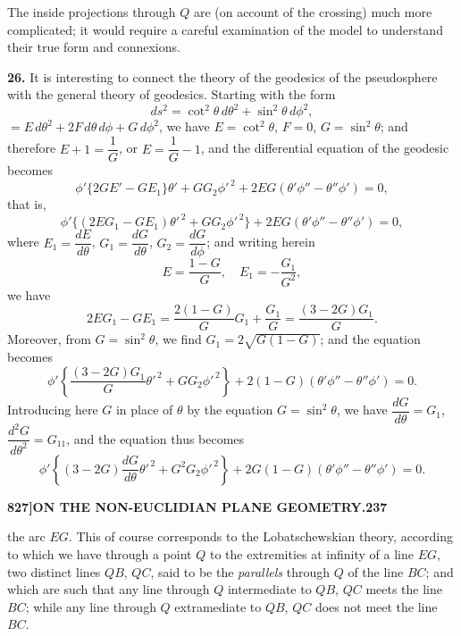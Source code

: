 \documentclass[12pt,a4paper]{article}
\theoremstyle{definition}
\begin{document}
The inside projections through $Q$ are (on account of the crossing) much more complicated; it would require a careful examination of the model to understand their true form and connexions.

\noindent\textbf{26.} It is interesting to connect the theory of the geodesics of the pseudosphere with the general theory of geodesics. Starting with the form
\[
ds^2 = \cot^2\theta\, d\theta^2 + \sin^2\theta\, d\phi^2,
\]
$= E\,d\theta^2 + 2F\,d\theta\,d\phi + G\,d\phi^2$, we have $E = \cot^2\theta$, $F = 0$, $G = \sin^2\theta$; and therefore $E + 1 = \dfrac{1}{G}$, or $E = \dfrac{1}{G} - 1$, and the differential equation of the geodesic becomes
\[
\phi'\{2GE' - GE_1\}\theta' + GG_2\phi'^{\,2} + 2EG(\theta'\phi'' - \theta''\phi') = 0,
\]
that is,
\[
\phi'\{(2EG_1 - GE_1)\theta'^{\,2} + GG_2\phi'^{\,2}\} + 2EG(\theta'\phi'' - \theta''\phi') = 0,
\]
where $E_1 = \dfrac{dE}{d\theta}$, $G_1 = \dfrac{dG}{d\theta}$, $G_2 = \dfrac{dG}{d\phi}$; and writing herein
\[
E = \frac{1-G}{G}, \quad E_1 = -\frac{G_1}{G^2},
\]
we have
\[
2EG_1 - GE_1 = \frac{2(1-G)}{G}G_1 + \frac{G_1}{G} = \frac{(3-2G)G_1}{G}.
\]
Moreover, from $G = \sin^2\theta$, we find $G_1 = 2\sqrt{G(1-G)}$; and the equation becomes
\[
\phi'\left\{\frac{(3-2G)G_1}{G}\theta'^{\,2} + GG_2\phi'^{\,2}\right\} + 2(1-G)(\theta'\phi'' - \theta''\phi') = 0.
\]
Introducing here $G$ in place of $\theta$ by the equation $G = \sin^2\theta$, we have $\dfrac{dG}{d\theta} = G_1$, $\dfrac{d^2G}{d\theta^2} = G_{11}$, and the equation thus becomes
\[
\phi'\left\{(3-2G)\frac{dG}{d\theta}\theta'^{\,2} + G^2G_2\phi'^{\,2}\right\} + 2G(1-G)(\theta'\phi'' - \theta''\phi') = 0.
\]

\newpage
\setcounter{page}{237}

\noindent\textbf{827]}\hfill\textbf{ON THE NON-EUCLIDIAN PLANE GEOMETRY.}\hfill\textbf{237}

\bigskip

\noindent the arc $EG$. This of course corresponds to the Lobatschewskian theory, according to which we have through a point $Q$ to the extremities at infinity of a line $EG$, two distinct lines $QB$, $QC$, said to be the \textit{parallels} through $Q$ of the line $BC$; and which are such that any line through $Q$ intermediate to $QB$, $QC$ meets the line $BC$; while any line through $Q$ extramediate to $QB$, $QC$ does not meet the line $BC$.
\end{document}
